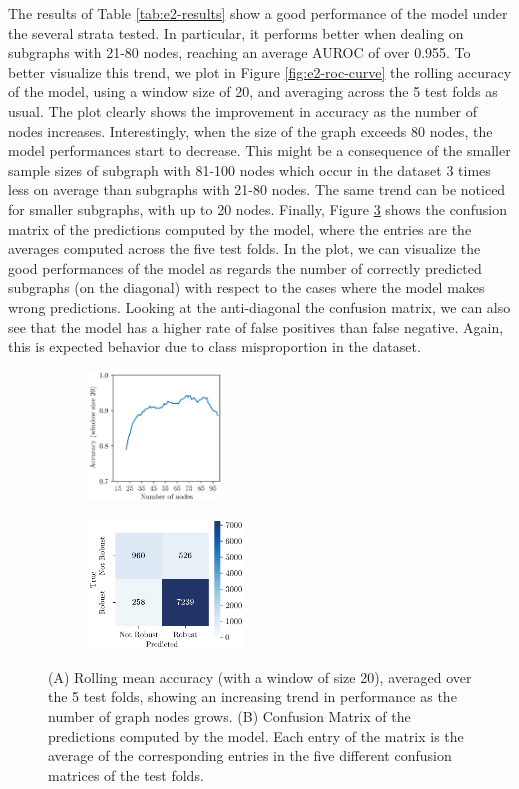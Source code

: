 The results of Table \ref{tab:e2-results} show a good performance of the model under the several strata tested. In particular, it performs better when dealing on subgraphs with 21-80 nodes, reaching an average AUROC of over 0.955. To better visualize this trend, we plot in Figure \ref{fig:e2-roc-curve} the rolling accuracy of the model, using a window size of 20, and averaging across the 5 test folds as usual. The plot clearly shows the improvement in accuracy as the number of nodes increases. Interestingly, when the size of the graph exceeds 80 nodes, the model performances start to decrease. This might be a consequence of the smaller sample sizes of subgraph with 81-100 nodes which occur in the dataset 3 times less on average than subgraphs with 21-80 nodes. The same trend can be noticed for smaller subgraphs, with up to 20 nodes. Finally, Figure \ref{fig:e2-conf-matrix} shows the confusion matrix of the predictions computed by the model, where the entries are the averages computed across the five test folds. In the plot, we can visualize the good performances of the model as regards the number of correctly predicted subgraphs (on the diagonal) with respect to the cases where the model makes wrong predictions. Looking at the anti-diagonal the confusion matrix, we can also see that the model has a higher rate of false positives than false negative. Again, this is expected behavior due to class misproportion in the dataset.
\begin{figure}[h!]
    \begin{subfigure}[b]{0.48\linewidth}
    \centering
        \includegraphics[height=130px]{Figures/Chapter5/e2-rolling-acc.eps}
        \subcaption{}\label{fig:e2-rolling-acc}
    \end{subfigure}
    \begin{subfigure}[b]{0.48\linewidth}
        \centering
        \includegraphics[height=130px]{Figures/Chapter5/e2-conf-matrix.eps}
        \subcaption{}\label{fig:e2-conf-matrix}
    \end{subfigure}
    \caption{({\scriptsize A}) Rolling mean accuracy (with a window of size 20), averaged over the 5 test folds, showing an increasing trend in performance as the number of graph nodes grows. ({\scriptsize B}) Confusion Matrix of the predictions computed by the model. Each entry of the matrix is the average of the corresponding entries in the five different confusion matrices of the test folds.}
\end{figure}


